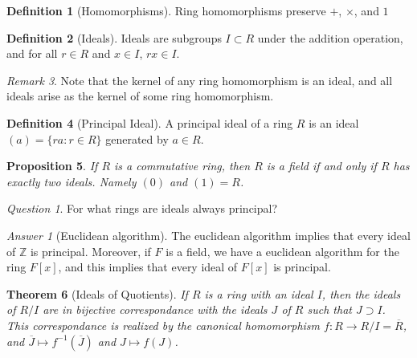 \documentclass[12pt]{article}
\newtheorem{thm}{Theorem}[section]
\newtheorem{prop}[thm]{Proposition}
\theoremstyle{definition}
\newtheorem{defn}[thm]{Definition}
\theoremstyle{remark}
\newtheorem{rmk}[thm]{Remark}
\newtheorem*{qst}{Question}
\newtheorem*{ans}{Answer}
\numberwithin{equation}{section}
\newcommand\Z{\mathbb Z}    %
\begin{document}
\vspace{15pt}

\begin{defn}[Homomorphisms]
        Ring homomorphisms preserve $+$, $\times$, and $1$
\end{defn}


\vspace{15pt}

\begin{defn}[Ideals]
        Ideals are subgroups $I \subset R$ under the addition operation, and for all $r \in R$ and $x \in I$, $rx \in I$.
\end{defn}


\vspace{15pt}

\begin{rmk}
        Note that the kernel of any ring homomorphism is an ideal, and all ideals arise as the kernel of some ring homomorphism.
\end{rmk}

\vspace{15pt}

\begin{defn}[Principal Ideal]
        A principal ideal of a ring $R$ is an ideal $(a) = \{ra: r \in R\}$ generated by $a \in R$.
\end{defn}

\vspace{15pt}


\begin{prop}
        If $R$ is a commutative ring, then $R$ is a field if and only if $R$ has exactly two ideals. Namely $(0)$ and $(1) = R$.
\end{prop}

\vspace{15pt}


\begin{qst}
        For what rings are ideals always principal?
\end{qst}

\begin{ans}[Euclidean algorithm]
        The euclidean algorithm implies that every ideal of $\Z$ is principal. Moreover, if $F$ is a field, we have a euclidean algorithm for the ring $F[x]$, and this implies that every ideal of $F[x]$ is principal.
\end{ans}

\vspace{15pt}


\begin{thm}[Ideals of Quotients]
        If $R$ is a ring with an ideal $I$, then the ideals of $R/I$ are in bijective correspondance with the ideals $J$ of $R$ such that $J \supset I$. This correspondance is realized by the canonical homomorphism $f:R\rightarrow R/I = \overline{R}$, and $\overline{J}\mapsto f^{-1}(\overline{J})$ and $J\mapsto f(J)$.
\end{thm}
\end{document}
